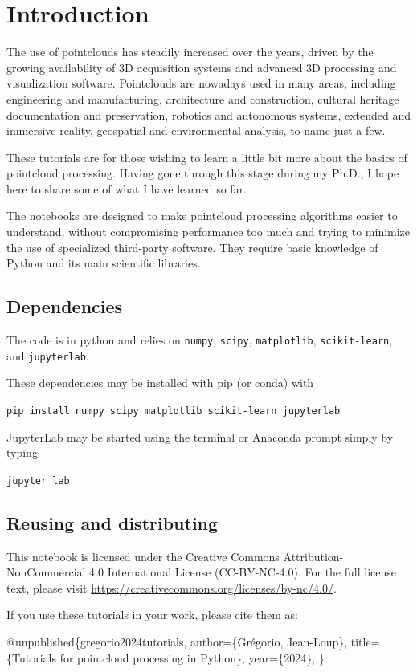 \section*{Introduction}

The use of pointclouds has steadily increased over the years, driven by the growing availability of 3D acquisition systems and advanced 3D processing and visualization software. Pointclouds are nowadays used in many areas, including engineering and manufacturing, architecture and construction, cultural heritage documentation and preservation, robotics and autonomous systems, extended and immersive reality, geospatial and environmental analysis, to name just a few.

These tutorials are for those wishing to learn a little bit more about the basics of pointcloud processing. Having gone through this stage during my Ph.D., I hope here to share some of what I have learned so far.

The notebooks are designed to make pointcloud processing algorithms easier to understand, without compromising performance too much and trying to minimize the use of specialized third-party software. They require basic knowledge of Python and its main scientific libraries.

\subsection*{Dependencies}

The code is in python and relies on \texttt{numpy}, \texttt{scipy}, \texttt{matplotlib}, \texttt{scikit-learn}, and \texttt{jupyterlab}.

These dependencies may be installed with pip (or conda) with

\texttt{pip install numpy scipy matplotlib scikit-learn jupyterlab}

JupyterLab may be started using the terminal or Anaconda prompt simply by typing 

\texttt{jupyter lab}

\subsection*{Reusing and distributing}

This notebook is licensed under the Creative Commons Attribution-NonCommercial 4.0 International License (CC-BY-NC-4.0). For the full license text, please visit \url{https://creativecommons.org/licenses/by-nc/4.0/}.

If you use these tutorials in your work, please cite them as:

\begin{Shaded}
\begin{Highlighting}[]

@unpublished\{gregorio2024tutorials,
     author=\{Grégorio, Jean-Loup\},
     title=\{Tutorials for pointcloud processing in Python\},
     year=\{2024\},
\}

\end{Highlighting}
\end{Shaded}
